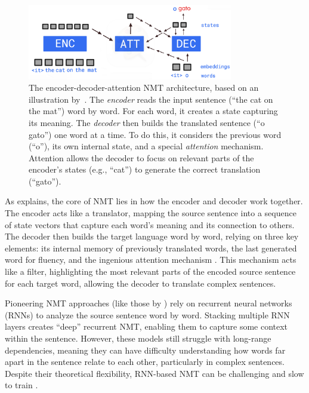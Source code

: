 {{\begin{figure}[ht]
\centering
\includegraphics[width=0.8\textwidth]{textual/Figuras/enc-dec.png}
\caption{The encoder-decoder-attention NMT architecture, based on an illustration by~\textcite{lakew2019multilingual}. The \emph{encoder} reads the input sentence (``the cat on the mat'') word by word. For each word, it creates a state capturing its meaning. The \emph{decoder} then builds the translated sentence (``o gato'') one word at a time. To do this, it considers the previous word (``o''), its own internal state, and a special \emph{attention} mechanism. Attention allows the decoder to focus on relevant parts of the encoder's states (e.g., ``cat'') to generate the correct translation (``gato'').}
\label{fig: Encoder-decoder-attention} 
\end{figure}

As \textcite{lakew2019multilingual} explains, the core of NMT lies in how the encoder and decoder work together. The encoder acts like a translator, mapping the source sentence into a sequence of state vectors that capture each word's meaning and its connection to others. The decoder then builds the target language word by word, relying on three key elements: its internal memory of previously translated words, the last generated word for fluency, and the ingenious attention mechanism \parencite{luong2015effective}. This mechanism acts like a filter, highlighting the most relevant parts of the encoded source sentence for each target word, allowing the decoder to translate complex sentences.

Pioneering NMT approaches (like those by \textcite{sutskever2014sequence}) rely on recurrent neural networks (RNNs) to analyze the source sentence word by word. Stacking multiple RNN layers creates ``deep'' recurrent NMT, enabling them to capture some context within the sentence. However, these models still struggle with long-range dependencies, meaning they can have difficulty understanding how words far apart in the sentence relate to each other, particularly in complex sentences. Despite their theoretical flexibility, RNN-based NMT can be challenging and slow to train \parencite{lakew2019multilingual}.

}}
